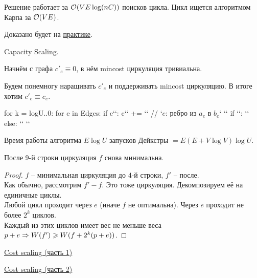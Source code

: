 \down
Решение работает за $\mathcal{O}(VE \log (nC))$ поисков цикла. Цикл ищется алгоритмом Карпа за $\mathcal{O}(VE)$.

Доказано будет на \href{http://acm.math.spbu.ru/~sk1/courses/1718f_au2/practice/171006.pdf}{практике}.

 Capacity Scaling.

Начнём с графа $c'_e \equiv 0$, в нём mincost циркуляция тривиальна.

Будем понемногу наращивать $c'_e$ и поддерживать mincost циркуляцию. В итоге хотим $c'_e \equiv c_e$.


\begin{code}
for k = logU..0:
	for e in Edges:
		if c`\color{black}{$_e$ содержит бит $2^k$}`:
			c`\color{black}{$'_e$}` += `\color{black}{$2^k$}` // `\t{$e$: ребро из $a_e$ в $b_e$}`
			`\color{black}{Найдём $p$ -- кратчайший путь $a_e \to b_e$}`
			if `\color{black}{$W(p) + w_e \ge 0$}`:
				`\color{black}{нет отрицательных циклов $\SO$ циркуляция $f$ оптимальна}`
			else:
				`\color{black}{пустим $2^k$ потока по циклу $p + e$ (изменим $f$)}`
				`\color{black}{пересчитаем потенциалы, используя расстояния, найденные Дейкстрой}`
\end{code}
Время работы алгоритма $E \log U$ запусков Дейкстры $= E(E + V\log V)\log U$.

\begin{Lm}После $9$-й строки циркуляция $f$ снова минимальна.\end{Lm}
\begin{proof}
$f$ -- минимальная циркуляция до $4$-й строки, $f'$ -- после. \\
Как обычно, рассмотрим $f' - f$. Это тоже циркуляция. Декомпозируем её на единичные циклы. \\
Любой цикл проходит через $e$ (иначе $f$ не оптимальна). Через $e$ проходит не более $2^k$ циклов. \\
Каждый из этих циклов имеет вес не меньше веса $p+e \Rightarrow W(f') \geqslant W(f + 2^k(p+e))$.
\end{proof}

\up\up
{}


\href{https://people.orie.cornell.edu/dpw/orie633/LectureNotes/lecture14.pdf}{Cost scaling (часть 1)}

\href{https://people.orie.cornell.edu/dpw/orie633/LectureNotes/lecture15.pdf}{Cost scaling (часть 2)}
